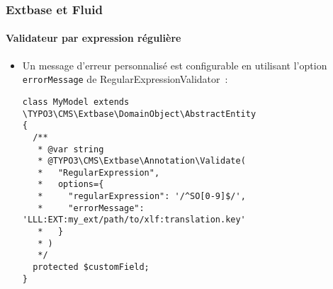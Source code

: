 %

\begin{frame}[fragile]
	\frametitle{Extbase et Fluid}
	\framesubtitle{Validateur par expression régulière}

	\lstset{basicstyle=\tiny\ttfamily}

	\begin{itemize}
		\item Un message d'erreur personnalisé est configurable en utilisant l'option
			\texttt{errorMessage} de RegularExpressionValidator~:
\begin{lstlisting}
class MyModel extends \TYPO3\CMS\Extbase\DomainObject\AbstractEntity
{
  /**
   * @var string
   * @TYPO3\CMS\Extbase\Annotation\Validate(
   *   "RegularExpression",
   *   options={
   *     "regularExpression": '/^SO[0-9]$/',
   *     "errorMessage": 'LLL:EXT:my_ext/path/to/xlf:translation.key'
   *   }
   * )
   */
  protected $customField;
}
\end{lstlisting}

	\end{itemize}

\end{frame}

